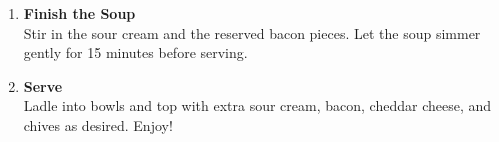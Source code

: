 \begin{enumerate}
      \item \textbf{Finish the Soup} \\
            Stir in the sour cream and the reserved bacon pieces. Let the soup simmer gently for 15 minutes before serving.

      \item \textbf{Serve} \\
            Ladle into bowls and top with extra sour cream, bacon, cheddar cheese, and chives as desired. Enjoy!

\end{enumerate}

